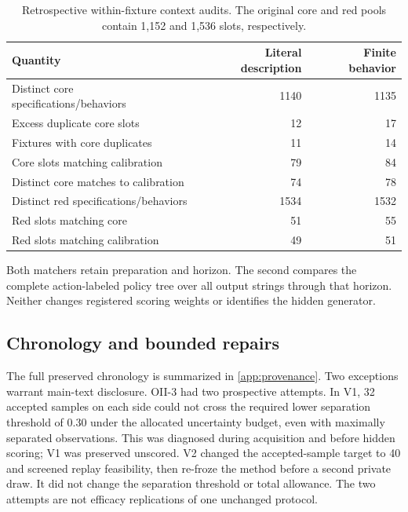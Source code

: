 \begin{table}[tbp]
\centering
\caption{Retrospective within-fixture context audits. The original core and red pools contain 1,152 and 1,536 slots, respectively.}\label{tab:contexts}
\small
\setlength{\tabcolsep}{5pt}
\begin{tabular}{lrr}
\toprule
Quantity & Literal description & Finite behavior \\
\midrule
Distinct core specifications/behaviors & 1140 & 1135 \\
Excess duplicate core slots & 12 & 17 \\
Fixtures with core duplicates & 11 & 14 \\
Core slots matching calibration & 79 & 84 \\
Distinct core matches to calibration & 74 & 78 \\
Distinct red specifications/behaviors & 1534 & 1532 \\
Red slots matching core & 51 & 55 \\
Red slots matching calibration & 49 & 51 \\
\bottomrule
\end{tabular}
\par\smallskip\begin{minipage}{\linewidth}\footnotesize Both matchers retain preparation and horizon. The second compares the complete action-labeled policy tree over all output strings through that horizon. Neither changes registered scoring weights or identifies the hidden generator.\end{minipage}
\end{table}



\subsection{Chronology and bounded repairs}\label{p3:c21}
The full preserved chronology is summarized in \cref{app:provenance}. Two exceptions warrant main-text disclosure. OII-3 had two prospective attempts. In V1, 32 accepted samples on each side could not cross the required lower separation threshold of 0.30 under the allocated uncertainty budget, even with maximally separated observations. This was diagnosed during acquisition and before hidden scoring; V1 was preserved unscored. V2 changed the accepted-sample target to 40 and screened replay feasibility, then re-froze the method before a second private draw. It did not change the separation threshold or total allowance. The two attempts are not efficacy replications of one unchanged protocol.

